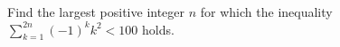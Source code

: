Find the largest positive integer $n$ for which the inequality $\sum_{k=1}^{2n} (-1)^k k^2 < 100$ holds.
